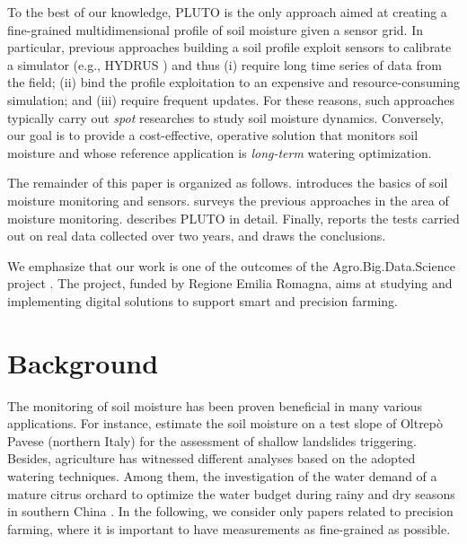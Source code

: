 To the best of our knowledge, PLUTO is the only approach aimed at creating a fine-grained multidimensional profile of soil moisture given a sensor grid.
In particular, previous approaches building a soil profile exploit sensors to calibrate a simulator (e.g., HYDRUS \cite{hydrus2008587}) and thus (i) require long time series of data from the field; (ii) bind the profile exploitation to an expensive and resource-consuming simulation; and (iii) require frequent updates. 
For these reasons, such approaches typically carry out \textit{spot} researches to study soil moisture dynamics.
Conversely, our goal is to provide a cost-effective, operative solution that monitors soil moisture and whose reference application is \textit{long-term} watering optimization.

The remainder of this paper is organized as follows.  introduces the basics of soil moisture monitoring and sensors.  surveys the previous approaches in the area of moisture monitoring.  describes PLUTO in detail. Finally,  reports the tests carried out on real data collected over two years, and  draws the conclusions.

We emphasize that our work is one of the outcomes of the Agro.Big.Data.Science project \cite{ABDS}.
The project, funded by Regione Emilia Romagna, aims at studying and implementing digital solutions to support smart and precision farming.

\section{Background}
\label{pluto-sec:background}
The monitoring of soil moisture has been proven beneficial in many various applications.
For instance, \cite{Bordoni2018333} estimate the soil moisture on a test slope of Oltrepò Pavese (northern Italy) for the assessment of shallow landslides triggering.
Besides, agriculture has witnessed different analyses based on the adopted watering techniques.
Among them, the investigation of the water demand of a mature citrus orchard to optimize the water budget during rainy and dry seasons in southern China \cite{Tu2021}. 
In the following, we consider only papers related to precision farming, where it is important to have measurements as fine-grained as possible.

